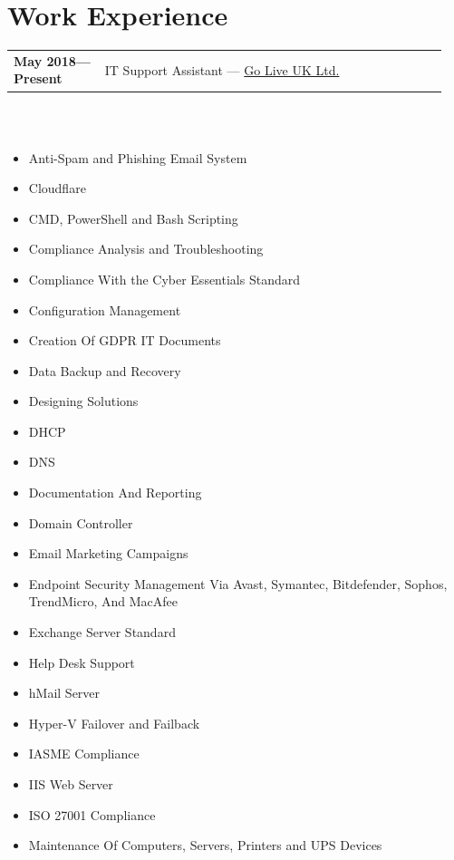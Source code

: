\documentclass[letterpaper,10pt]{article}
\begin{document}
	\newpage
			
		\section*{Work Experience}
		\begin{tabular}{@{}p{0.2\linewidth} p{0.75\linewidth}}
			\textbf{May 2018—Present} & IT Support Assistant — \href{https://www.goliveuk.com/}{Go Live UK Ltd.} \\
		\end{tabular}
		\\
		\begin{center}
			\begin{minipage}[t]{0.5\textwidth}
				\section*{}
				\begin{itemize}
\item Anti-Spam and Phishing Email System
\item Cloudflare
\item CMD, PowerShell and Bash Scripting
\item Compliance Analysis and Troubleshooting
\item Compliance With the Cyber Essentials Standard
\item Configuration Management
\item Creation Of GDPR IT Documents
\item Data Backup and Recovery
\item Designing Solutions
\item DHCP
\item DNS
\item Documentation And Reporting
\item Domain Controller
\item Email Marketing Campaigns
\item Endpoint Security Management Via Avast, Symantec, Bitdefender, Sophos, TrendMicro, And MacAfee
\item Exchange Server Standard
\item Help Desk Support
\item hMail Server
\item Hyper-V Failover and Failback
\item IASME Compliance
\item IIS Web Server
\item ISO 27001 Compliance
\item Maintenance Of Computers, Servers, Printers and UPS Devices
				\end{itemize}
			\end{minipage}%
			\begin{minipage}[t]{0.5\textwidth}

\end{minipage}
\end{center}
\end{document}
